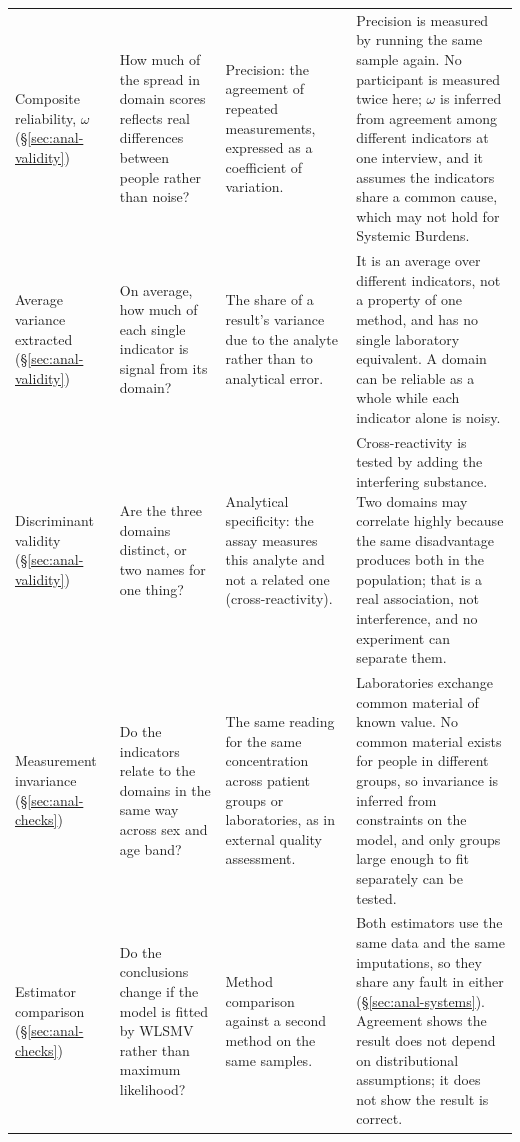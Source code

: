 {\begin{longtable}{p{2.2cm} p{3.4cm} p{3.6cm} p{4.4cm}}
\addlinespace
Composite reliability, $\omega$ (\S\ref{sec:anal-validity}) & How much of the spread in domain scores reflects real differences between people rather than noise? & Precision: the agreement of repeated measurements, expressed as a coefficient of variation. & Precision is measured by running the same sample again. No participant is measured twice here; $\omega$ is inferred from agreement among different indicators at one interview, and it assumes the indicators share a common cause, which may not hold for Systemic Burdens. \\
\addlinespace
Average variance extracted (\S\ref{sec:anal-validity}) & On average, how much of each single indicator is signal from its domain? & The share of a result's variance due to the analyte rather than to analytical error. & It is an average over different indicators, not a property of one method, and has no single laboratory equivalent. A domain can be reliable as a whole while each indicator alone is noisy. \\
\addlinespace
Discriminant validity (\S\ref{sec:anal-validity}) & Are the three domains distinct, or two names for one thing? & Analytical specificity: the assay measures this analyte and not a related one (cross-reactivity). & Cross-reactivity is tested by adding the interfering substance. Two domains may correlate highly because the same disadvantage produces both in the population; that is a real association, not interference, and no experiment can separate them. \\
\addlinespace
Measurement invariance (\S\ref{sec:anal-checks}) & Do the indicators relate to the domains in the same way across sex and age band? & The same reading for the same concentration across patient groups or laboratories, as in external quality assessment. & Laboratories exchange common material of known value. No common material exists for people in different groups, so invariance is inferred from constraints on the model, and only groups large enough to fit separately can be tested. \\
\addlinespace
Estimator comparison (\S\ref{sec:anal-checks}) & Do the conclusions change if the model is fitted by WLSMV rather than maximum likelihood? & Method comparison against a second method on the same samples. & Both estimators use the same data and the same imputations, so they share any fault in either (\S\ref{sec:anal-systems}). Agreement shows the result does not depend on distributional assumptions; it does not show the result is correct. \\
\bottomrule
\end{longtable}
}

